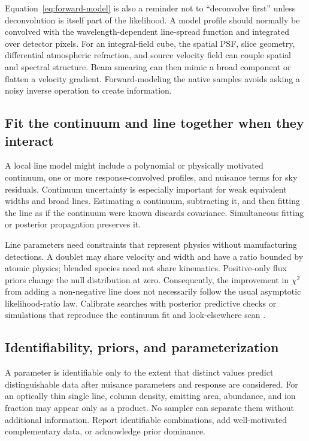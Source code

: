 Equation~\ref{eq:forward-model} is also a reminder not to ``deconvolve first''
unless deconvolution is itself part of the likelihood.  A model profile should
normally be convolved with the wavelength-dependent line-spread function and
integrated over detector pixels.  For an integral-field cube, the spatial PSF,
slice geometry, differential atmospheric refraction, and source velocity field
can couple spatial and spectral structure.  Beam smearing can then mimic a
broad component or flatten a velocity gradient.  Forward-modeling the native
samples avoids asking a noisy inverse operation to create information.

\subsection{Fit the continuum and line together when they interact}

A local line model might include a polynomial or physically motivated continuum,
one or more response-convolved profiles, and nuisance terms for sky residuals.
Continuum uncertainty is especially important for weak equivalent widths and
broad lines.  Estimating a continuum, subtracting it, and then fitting the line
as if the continuum were known discards covariance.  Simultaneous fitting or
posterior propagation preserves it.

Line parameters need constraints that represent physics without manufacturing
detections.  A doublet may share velocity and width and have a ratio bounded by
atomic physics; blended species need not share kinematics.  Positive-only flux
priors change the null distribution at zero.  Consequently, the improvement in
$\chi^2$ from adding a non-negative line does not necessarily follow the usual
asymptotic likelihood-ratio law.  Calibrate searches with posterior predictive
checks or simulations that reproduce the continuum fit and look-elsewhere scan
\citep{Protassov2002}.

\subsection{Identifiability, priors, and parameterization}

A parameter is identifiable only to the extent that distinct values predict
distinguishable data after nuisance parameters and response are considered.
For an optically thin single line, column density, emitting area, abundance,
and ion fraction may appear only as a product.  No sampler can separate them
without additional information.  Report identifiable combinations, add
well-motivated complementary data, or acknowledge prior dominance.

